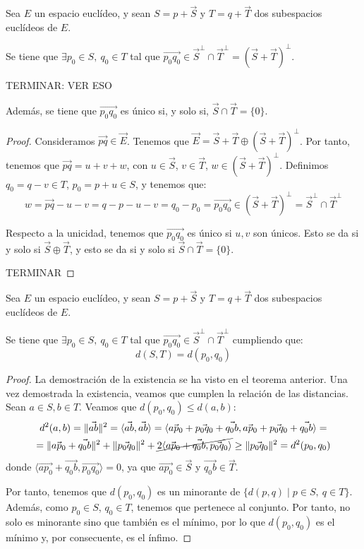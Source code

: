 \begin{teo}
    Sea $E$ un espacio euclídeo, y sean $S=p+\vec{S}$ y $T=q+\vec{T}$ dos subespacios euclídeos de $E$.

    Se tiene que $\exists p_0\in S,~ q_0\in T$ tal que $\vec{p_0q_0}\in \vec{S}^\perp\cap \vec{T}^\perp = (\vec{S} + \vec{T})^\perp$.

    TERMINAR: VER ESO

    Además, se tiene que $\vec{p_0q_0}$ es único si, y solo si, $\vec{S}\cap \vec{T}=\{0\}$.
\end{teo}
\begin{proof}
    Consideramos $\vec{pq}\in \vec{E}$. Tenemos que $\vec{E}=\vec{S}+\vec{T} \oplus (\vec{S}+\vec{T})^\perp$. Por tanto, tenemos que $\vec{pq}=u+v+w$, con $u\in \vec{S}$, $v\in \vec{T}$, $w\in (\vec{S}+\vec{T})^\perp$. Definimos $q_0=q-v\in T$, $p_0= p+u\in S$, y tenemos que:
    \begin{equation*}
        w = \vec{pq} - u -v = q-p-u-v=q_0-p_0=\vec{p_0q_0} \in (\vec{S} + \vec{T})^\perp = \vec{S}^\perp\cap \vec{T}^\perp
    \end{equation*}

    Respecto a la unicidad, tenemos que $\vec{p_0q_0}$ es único si $u,v$ son únicos. Esto se da si y solo si $\vec{S}\oplus \vec{T}$, y esto se da si y solo si $\vec{S}\cap \vec{T}=\{0\}$.

    TERMINAR
\end{proof}

\begin{coro}\label{coro:dist_ortogonal}
    Sea $E$ un espacio euclídeo, y sean $S=p+\vec{S}$ y $T=q+\vec{T}$ dos subespacios euclídeos de $E$.

    Se tiene que $\exists p_0\in S,~ q_0\in T$ tal que $\vec{p_0q_0}\in \vec{S}^\perp\cap \vec{T}^\perp$ cumpliendo que:
    \begin{equation*}
        d(S,T)=d(p_0,q_0)
    \end{equation*}
\end{coro}
\begin{proof}
    La demostración de la existencia se ha visto en el teorema anterior. Una vez demostrada la existencia, veamos que cumplen la relación de las distancias. Sean $a\in S, b\in T$. Veamos que $d(p_0,q_0)\leq d(a,b)$:
    \begin{multline*}
        d^2(a,b)=\|\vec{ab}\|^2= \langle\vec{ab},\vec{ab}\rangle = 
        \langle\vec{ap_0}+\vec{p_0q_0}+\vec{q_0b},\vec{ap_0}+\vec{p_0q_0}+\vec{q_0b}\rangle = \\=
        \|\vec{ap_0}+\vec{q_0b}\|^2 + \|\vec{p_0q_0}\|^2 + \cancel{2\langle\vec{ap_0}+\vec{q_0b},\vec{p_0q_0}\rangle} \geq \|\vec{p_0q_0}\|^2 = d^2(p_0,q_0)
    \end{multline*}
    donde $\langle\vec{ap_0}+\vec{q_0b},\vec{p_0q_0}\rangle=0$, ya que $\vec{ap_0}\in \vec{S}$ y $\vec{q_0b}\in \vec{T}$.

    Por tanto, tenemos que $d(p_0,q_0)$ es un minorante de $\{d(p,q)\mid p\in S,~q\in T\}$. Además, como $p_0\in S$, $q_0\in T$, tenemos que pertenece al conjunto. Por tanto, no solo es minorante sino que también es el mínimo, por lo que $d(p_0,q_0)$ es el mínimo y, por consecuente, es el ínfimo.
\end{proof}


